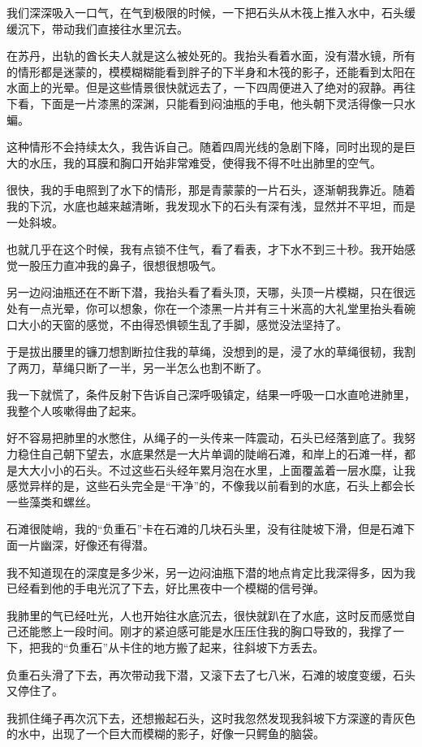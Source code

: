 我们深深吸入一口气，在气到极限的时候，一下把石头从木筏上推入水中，石头缓缓沉下，带动我们直接往水里沉去。

在苏丹，出轨的酋长夫人就是这么被处死的。我抬头看着水面，没有潜水镜，所有的情形都是迷蒙的，模模糊糊能看到胖子的下半身和木筏的影子，还能看到太阳在水面上的光晕。但是这些情景很快就远去了，一下四周便进入了绝对的寂静。再往下看，下面是一片漆黑的深渊，只能看到闷油瓶的手电，他头朝下灵活得像一只水蝙。

这种情形不会持续太久，我告诉自己。随着四周光线的急剧下降，同时出现的是巨大的水压，我的耳膜和胸口开始非常难受，使得我不得不吐出肺里的空气。

很快，我的手电照到了水下的情形，那是青蒙蒙的一片石头，逐渐朝我靠近。随着我的下沉，水底也越来越清晰，我发现水下的石头有深有浅，显然并不平坦，而是一处斜坡。

也就几乎在这个时候，我有点锁不住气，看了看表，才下水不到三十秒。我开始感觉一股压力直冲我的鼻子，很想很想吸气。

另一边闷油瓶还在不断下潜，我抬头看了看头顶，天哪，头顶一片模糊，只在很远处有一点光晕，你可以想象，你在一个漆黑一片并有三十米高的大礼堂里抬头看碗口大小的天窗的感觉，不由得恐惧顿生乱了手脚，感觉没法坚持了。

于是拔出腰里的镰刀想割断拉住我的草绳，没想到的是，浸了水的草绳很韧，我割了两刀，草绳只断了一半，另一半怎么也割不断了。

我一下就慌了，条件反射下告诉自己深呼吸镇定，结果一呼吸一口水直呛进肺里，我整个人咳嗽得曲了起来。

好不容易把肺里的水憋住，从绳子的一头传来一阵震动，石头已经落到底了。我努力稳住自己朝下望去，水底果然是一大片单调的陡峭石滩，和岸上的石滩一样，都是大大小小的石头。不过这些石头经年累月泡在水里，上面覆盖着一层水糜，让我感觉异样的是，这些石头完全是“干净”的，不像我以前看到的水底，石头上都会长一些藻类和螺丝。

石滩很陡峭，我的“负重石”卡在石滩的几块石头里，没有往陡坡下滑，但是石滩下面一片幽深，好像还有得潜。

我不知道现在的深度是多少米，另一边闷油瓶下潜的地点肯定比我深得多，因为我已经看到他的手电光沉了下去，好比黑夜中一个模糊的信号弹。

我肺里的气已经吐光，人也开始往水底沉去，很快就趴在了水底，这时反而感觉自己还能憋上一段时间。刚才的紧迫感可能是水压压住我的胸口导致的，我撑了一下，把我的“负重石”从卡住的地方搬了起来，往斜坡下方丢去。

负重石头滑了下去，再次带动我下潜，又滚下去了七八米，石滩的坡度变缓，石头又停住了。

我抓住绳子再次沉下去，还想搬起石头，这时我忽然发现我斜坡下方深邃的青灰色的水中，出现了一个巨大而模糊的影子，好像一只鳄鱼的脑袋。

